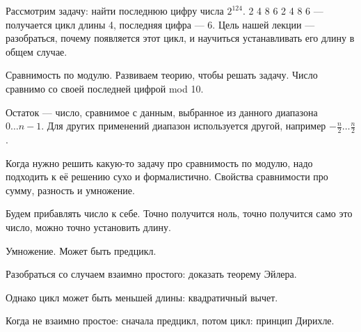\documentclass[a4paper,11pt]{article}
\begin{document}
Рассмотрим задачу: найти последнюю цифру числа $2^{124}$. 2 4 8 6 2 4 8 6 — получается цикл длины 4, последняя цифра — 6. Цель нашей лекции — разобраться, почему появляется этот цикл, и научиться устанавливать его длину в общем случае.

Сравнимость по модулю. Развиваем теорию, чтобы решать задачу. Число сравнимо со своей последней цифрой mod 10.

Остаток — число, сравнимое с данным, выбранное из данного диапазона $0 \ldots n-1$. Для других применений диапазон используется другой, например $-\frac{n}{2} \ldots \frac{n}{2}$.

Когда нужно решить какую-то задачу про сравнимость по модулю, надо подходить к её решению сухо и формалистично. Свойства сравнимости про сумму, разность и умножение.

Будем прибавлять число к себе. Точно получится ноль, точно получится само это число, можно точно установить длину.

Умножение. Может быть предцикл.

Разобраться со случаем взаимно простого: доказать теорему Эйлера.

Однако цикл может быть меньшей длины: квадратичный вычет.

Когда не взаимно простое: сначала предцикл, потом цикл: принцип Дирихле.
\end{document}
